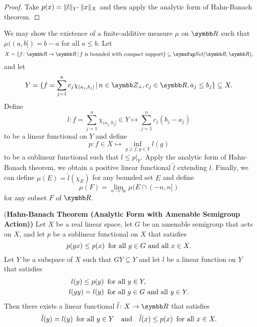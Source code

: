 \begin{proof}
  Take $p(x)=\Vert l\Vert_{Y'}\,\Vert x\Vert_X$ and then apply the analytic form of Hahn-Banach theorem.
\end{proof}

\begin{example}
  We may show the existence of a finite-additive measure $\mu$ on $\RR$ such that $\mu((a, b])=b-a$ for all $a\leq b$. Let
  \begin{equation*}
    X = \{f\colon\RR\to\RR\VERT f\text{ is bounded with compact support}\}\subseteq\CAT{Set}(\RR, \RR),
  \end{equation*}
  and let
  \begin{equation*}
    Y = \{f=\sum_{j=1}^nc_j\chi_{(a_j, b_j]}\VERT n\in\ZZ_+, c_j\in\RR, a_j\leq b_j\}\subseteq X.
  \end{equation*}
  Define
  \begin{equation*}
    l\colon f=\sum_{j=1}^n\chi_{(a_j, b_j]}\in Y\mapsto \sum_{j=1}^n c_j(b_j-a_j)
  \end{equation*}
  to be a linear functional on $Y$ and define
  \begin{equation*}
    p\colon f\in X\mapsto \inf_{g\geq f, g\in Y}l(g)
  \end{equation*}
  to be a sublinear functional such that $l\leq p\vert_Y$. Apply the analytic form of Hahn-Banach theorem, we obtain a positive linear functional $\tilde l$ extending $l$. Finally, we can define $\mu(E)=\tilde l(\chi_E)$ for any bounded set $E$ and define
  \begin{equation*}
    \mu(F)=\lim_{n\to\infty}\mu(E\cap (-n, n])
  \end{equation*}
  for any subset $F$ of $\RR$.
\end{example}

\begin{theorem}{(\bf Hahn-Banach Theorem (Analytic Form with Amenable Semigroup Action))}
  Let $X$ be a real linear space, let $G$ be an amenable semigroup that acts on $X$, and let $p$ be a sublinear functional on $X$ that satisfies
  \begin{equation*}
    p(gx)\leq p(x) \text{\enskip for all } g\in G \text{ and all } x\in X.
  \end{equation*}
  Let $Y$ be a subspace of $X$ such that $GY\subseteq Y$ and let $l$ be a linear function on $Y$ that satisfies
  \begin{equation*}
    \begin{aligned}
      l(y)\leq p(y) &\text{\enskip for all } y\in Y,\\
      l(gy)=l(y)&\text{\enskip for all } g\in G \text{ and all }y\in Y.
    \end{aligned}
  \end{equation*}
  Then there exists a linear functional $\tilde l\colon X\to\RR$ that satisfies
  \begin{equation*}
    \tilde l(y)=l(y)\text{\enskip for all }y\in Y\text{\quad and\quad} \tilde l(x)\leq p(x) \text{\enskip for all } x\in X.
  \end{equation*}
\end{theorem}


